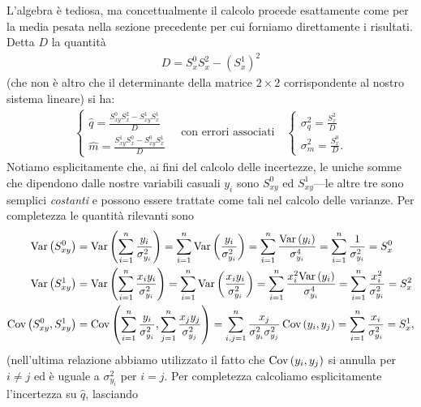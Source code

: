 L'algebra è tediosa, ma concettualmente il calcolo procede esattamente come
per la media pesata nella sezione precedente per cui forniamo direttamente i
risultati. Detta $D$ la quantità
\begin{align*}
  D = S_x^0S_x^2 - (S_x^1)^2
\end{align*}
(che non è altro che il determinante della matrice $2 \times 2$
corrispondente al nostro sistema lineare) si ha:
\begin{align}\label{eq:fit_mq_lineare}
  \begin{cases}
    \displaystyle \hat{q} = \frac{S_{xy}^0 S_x^2 - S_{xy}^1 S_x^1}{D}\\
    \displaystyle \hat{m} = \frac{S_{xy}^1 S_x^0 - S_{xy}^0 S_x^1}{D}
  \end{cases}
  \quad \text{con errori associati} \quad
  \begin{cases}
    \displaystyle \sigma_q^2 = \frac{S_x^2}{D}\\
    \displaystyle \sigma_m^2 = \frac{S_x^0}{D}.
  \end{cases}
\end{align}
Notiamo esplicitamente che, ai fini del calcolo delle incertezze, le uniche
somme che dipendono dalle nostre variabili casuali $y_i$ sono $S_{xy}^0$ ed
$S_{xy}^1$---le altre tre sono semplici \emph{costanti} e possono essere
trattate come tali nel calcolo delle varianze. Per completezza le
quantità rilevanti sono
\begin{align}
  \var{S_{xy}^0} & = \var{\sum_{i = 1}^{n} \frac{y_i}{\sigma_{y_i}^2}} =
  \sum_{i = 1}^{n} \var{\frac{y_i}{\sigma_{y_i}^2}} =
  \sum_{i = 1}^{n} \frac{\var{y_i}}{\sigma_{y_i}^4} =
  \sum_{i = 1}^{n} \frac{1}{\sigma_{y_i}^2} = S_x^0\\
  \var{S_{xy}^1} & =  \var{\sum_{i = 1}^{n} \frac{x_iy_i}{\sigma_{y_i}^2}} =
  \sum_{i = 1}^{n} \var{\frac{x_iy_i}{\sigma_{y_i}^2}} =
  \sum_{i = 1}^{n} \frac{x^2_i\var{y_i}}{\sigma_{y_i}^4} =
  \sum_{i = 1}^{n} \frac{x^2_i}{\sigma_{y_i}^2} = S_x^2 \\
  \cov{S_{xy}^0}{S_{xy}^1} & =
  \cov{\sum_{i = 1}^{n}\frac{y_i}{\sigma_{y_i}^2}}%
      {\sum_{j = 1}^{n}\frac{x_jy_j}{\sigma_{y_j}^2}} =
  \sum_{i, j = 1}^n \frac{x_j}{\sigma^2_{y_i} \sigma^2_{y_j}}\,\cov{y_i}{y_j} =
  \sum_{i = 1}^{n} \frac{x_i}{\sigma_{y_i}^2} = S_x^1,
\end{align}
(nell'ultima relazione abbiamo utilizzato il fatto che $\text{Cov}\left(y_i, y_j\right)$ si
annulla per $i \neq j$ ed è uguale a $\sigma^2_{y_i}$ per $i = j$.
Per completezza calcoliamo esplicitamente l'incertezza su $\hat{q}$, lasciando
